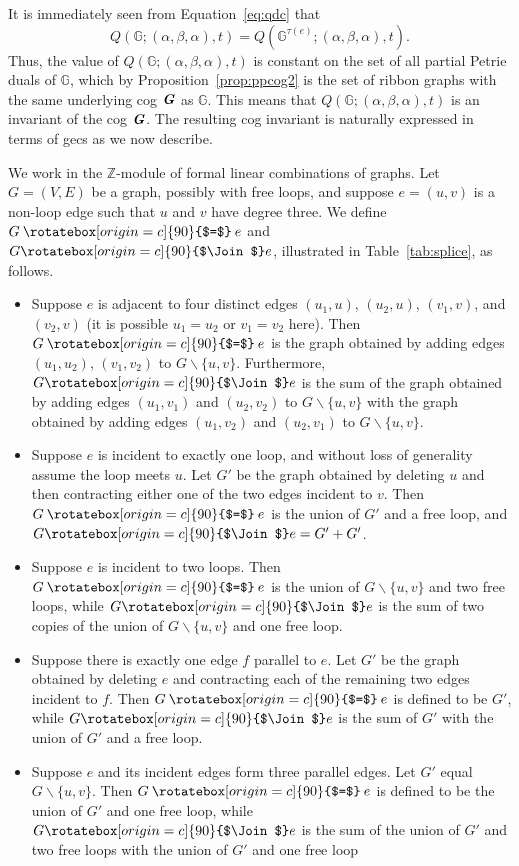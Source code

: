 \documentclass{amsart}
\newcommand{\bG}{\mathbb{G}}
\newcommand{\cog}[1]{\textbf{\textit #1}}
\newcommand{\hsplice}{\rotatebox[origin=c]{90}{$\Join$}}
\newcommand{\vsplice}{\mathbin{\rotatebox[origin=c]{90}{$=$}}}
\newcommand{\ba}{\mathbin{\backslash}}
\theoremstyle{definition}
\theoremstyle{remark}
\numberwithin{equation}{section}
\begin{document}
It is immediately seen from Equation~\eqref{eq:qdc} that 
\[Q(\bG; (\alpha,\beta,\alpha), t) = Q(\bG^{\tau(e)}; (\alpha,\beta,\alpha), t).\] 
Thus, the value of $Q(\bG; (\alpha,\beta,\alpha), t)$ is constant on the set of all partial Petrie duals of $\bG$, which by Proposition~\ref{prop:ppcog2} is the set of ribbon graphs with the same underlying cog $\cog{G}$ as $\bG$.  This means that $Q(\bG; (\alpha,\beta,\alpha), t)$  is an invariant of the cog $\cog{G}$.
The resulting cog invariant is naturally expressed in terms of gecs as we now describe.

\medskip

We work in the $\mathbb{Z}$-module of formal linear combinations of graphs. 
Let  $G=(V,E)$ be a graph, possibly with free loops, and suppose $e=(u,v)$ is a non-loop edge such that $u$ and $v$ have degree three. 
We define $G\vsplice e$ and $G\hsplice e$, illustrated in Table~\ref{tab:splice}, as follows. 
\begin{itemize}
\item Suppose $e$ is adjacent to four distinct edges $(u_1,u)$, $(u_2,u)$, $(v_1,v)$, and $(v_2,v)$ (it is possible $u_1=u_2$ or $v_1=v_2$ here). Then  $G\vsplice e$ is the graph obtained by adding edges $(u_1,u_2)$, $(v_1,v_2)$ to $G\ba \{u,v\}$. 
Furthermore, $G\hsplice e$ is the sum of the graph obtained by adding edges  $(u_1,v_1)$ and $(u_2,v_2)$ to $G\ba \{u,v\}$ with the graph obtained by adding edges  $(u_1,v_2)$ and $(u_2,v_1)$ to $G\ba \{u,v\}$.


\item Suppose $e$ is incident to exactly one loop, and without loss of generality assume the loop meets $u$. Let  $G'$ be the graph obtained by deleting $u$ and then contracting either one of the two edges incident to $v$.
Then  $G\vsplice e$ is the union of $G'$ and a free loop, and  $G\hsplice e = G'+G'$.

\item Suppose $e$ is incident to two loops. Then $G\vsplice e$ is the union of $G\ba \{u,v\}$ and two free loops, while $G\hsplice e$ is the sum of two copies of the union of $G\ba \{u,v\}$ and one free loop. 

\item Suppose there is exactly one edge $f$  parallel to $e$. Let $G'$ be the graph obtained by deleting $e$ and contracting each of the remaining two edges incident to $f$. Then   $G\vsplice e$ is defined to be $G'$, while   $G\hsplice e$ is the sum of $G'$ with the union of $G'$ and a free loop.

\item Suppose $e$ and its incident edges form three parallel edges. Let $G'$ equal $G\ba \{u,v\}$. Then  $G\vsplice e$ is defined to be the union of $G'$ and one free loop, while $G\hsplice e$ is the sum of the union of $G'$ and two free loops with the union of $G'$ and one free loop

\end{itemize}
\end{document}
